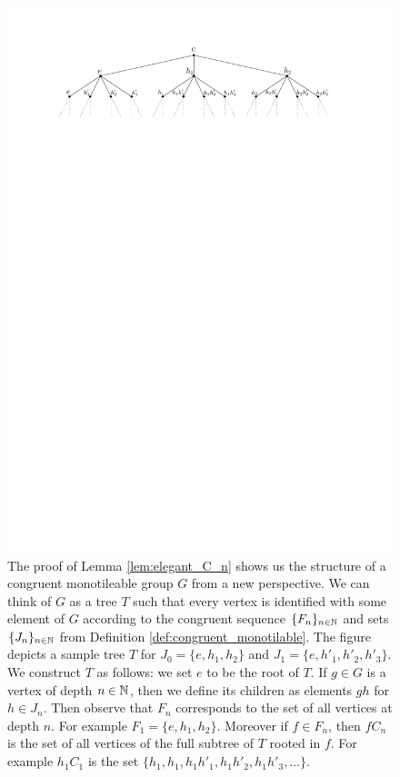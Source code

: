 \begin{figure}
\centering
\includegraphics[scale=1]{Graphics/tree_representation2}
\caption{The proof of Lemma \ref{lem:elegant_C_n} shows us the structure of a congruent monotileable group $G$ from a new perspective. We can think of $G$ as a tree $T$ such that every vertex is identified with some element of $G$ according to the congruent \Folner sequence $\{F_n\}_{n\in\mathbb{N}}$ and  sets $\{J_n\}_{n\in\mathbb{N}}$ from Definition \ref{def:congruent_monotilable}. The figure depicts a sample tree $T$ for $J_0=\{e,h_1,h_2\}$ and  $J_1=\{e,h'_1,h'_2,h'_3\}$. We construct $T$ as follows: 
we set $e$ to be the root of $T$. If $g\in G$ is a vertex of depth $n\in\mathbb{N}$, then we define its children as elements $gh$ for $h\in J_n$. Then observe that $F_n$ corresponds to the set of all vertices at depth $n$. For example $F_1 = \{e,h_1,h_2\}$. Moreover if $f\in F_n$, then $fC_n$ is the set of all vertices of the full subtree of $T$ rooted in $f$. For example $h_1C_1$ is the set $\{h_1,h_1,h_1h'_1,h_1h'_2,h_1h'_3,\ldots \}$.}\label{fig:tree}
\end{figure}

